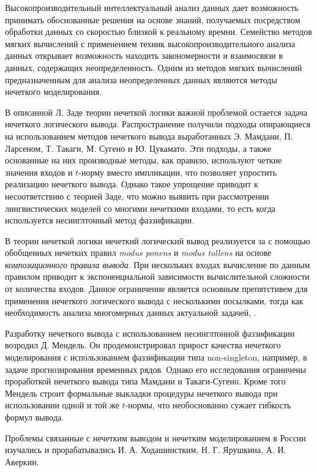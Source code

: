 
{\actuality} Высокопроизводительный интеллектуальный анализ данных дает возможность принимать обоснованные решения на основе знаний, получаемых посредством обработки данных со скоростью близкой к реальному времни. Семейство методов мягких вычислений с применением техник высокопроизводительного анализа данных открывает возможность находить закономерности и взаимосвязи в данных, содержащих неопределенность. Одним из методов мягких вычислений предназначенным для анализа неопределенных данных являются методы нечеткого моделирования.

В описанной Л. Заде теории нечеткой логики важной проблемой остается задача нечеткого логического вывода. Распространение получили подходы опирающиеся на использованием методов нечеткого вывода выработанных Э. Мамдани, П. Ларсеном, Т. Такаги, М. Сугено и Ю. Цукамато. Эти подходы, а также основанные на них производные методы, как правило, используют четкие значения входов и $t$-норму вместо импликации, что позволяет упростить реализацию нечеткого вывода. Однако такое упрощение приводит к несоответствию с теорией Заде, что можно выявить при рассмотрении лингвистических моделей со многими нечеткими входами, то есть когда используется несинглтонный метод фаззификации.

В теории нечеткой логики нечеткий логический вывод реализуется за с помощью обобщенных нечетких правил \textit{modus ponens} и \textit{modus tollens} на основе \textit{композиционного правила вывода}. При нескольких входах вычисление по данным правилом приводит к экспоненциальной зависимости вычислительной сложности от количества входов. Данное ограничение является основным препятстивем для применения нечеткого логического вывода с несколькими посылками, тогда как необходимость анализа многомерных данных  актуальной задачей, .

Разработку нечеткого вывода с использованием несинглтонной фаззификации возродил Д. Мендель. Он продемонстрировал прирост качества нечеткого моделирования с использованием фаззификации типа non-singleton, например, в задаче прогнозирования временных рядов. Однако его исследования ограничены проработкой нечеткого вывода типа Мамдани и Такаги-Сугено. Кроме того Мендель строит формальные выкладки процедуры нечеткого вывода при использовании одной и той же $t$-нормы, что необоснованно сужает гибкость формул вывода.

Проблемы связанные с нечетким выводом и нечетким моделированием в России изучались и прорабатывались И. А. Ходашинстким, Н. Г. Ярушкина, А. И. Аверкин.




